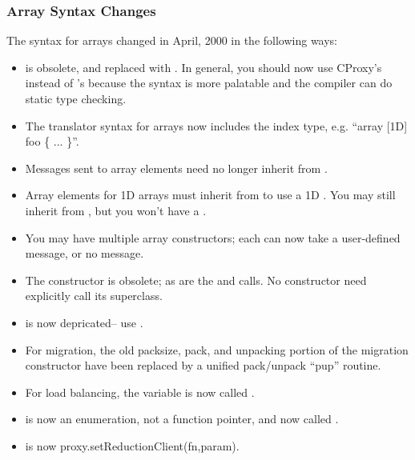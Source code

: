 \subsubsection{Array Syntax Changes}

The syntax for arrays changed in April, 2000 in the following ways:

\begin{itemize}

\item {} is obsolete, and replaced with .  In general,
you should now use CProxy's instead of 's because the syntax
is more palatable and the compiler can do static type checking.

\item The translator syntax for arrays now includes the index type,
e.g. ``array [1D] foo \{ ... \}''.

\item Messages sent to array elements need no longer inherit from 
.

\item Array elements for 1D arrays must inherit from  to use
a 1D .  You may still inherit from , but you
won't have a .

\item You may have multiple array constructors; each can now take a
user-defined message, or no message.  

\item The  constructor is obsolete;
as are the  and  calls. No
constructor need explicitly call its superclass.

\item {} is now depricated-- use 
.

\item For migration, the old packsize, pack, and unpacking portion of
the migration constructor have been replaced by a unified pack/unpack 
``pup'' routine.

\item For load balancing, the  variable is now called
.

\item {} is now an enumeration, not a function pointer,
and now called .

\item {} is now
proxy.setReductionClient(fn,param). 

\end{itemize}



